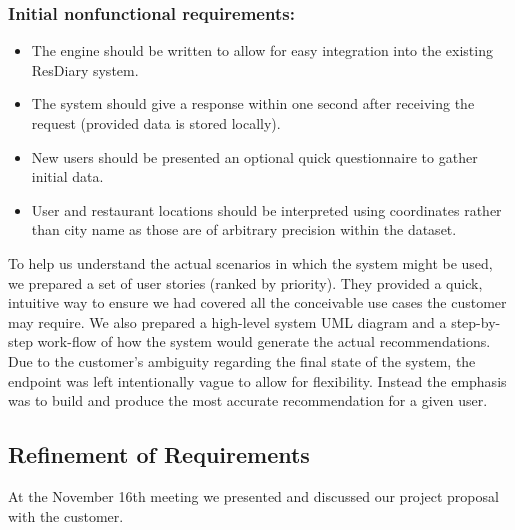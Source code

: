\documentclass{l3proj}
\begin{document}
\subsubsection{Initial nonfunctional requirements:}
\begin{itemize}
\item The engine should be written to allow for easy integration into the existing ResDiary system.
\item The system should give a response within one second after receiving the request (provided data is stored locally).
\item New users should be presented an optional quick questionnaire to gather initial data.
\item User and restaurant locations should be interpreted using coordinates rather than city name as those are of arbitrary precision within the dataset.
\end{itemize}

To help us understand the actual scenarios in which the system might be used, we prepared a set of user stories (ranked by priority). They provided a quick, intuitive way to ensure we had covered all the conceivable use cases the customer may require. We also prepared a high-level system UML diagram and a step-by-step work-flow of how the system would generate the actual recommendations. Due to the customer's ambiguity regarding the final state of the system, the endpoint was left intentionally vague to allow for flexibility. Instead the emphasis was to build and produce the most accurate recommendation for a given user. 


\subsection{Refinement of Requirements}
\label{sec:custrefineinitobj}


At the November 16th meeting we presented and discussed our project proposal with the customer.
\end{document}
